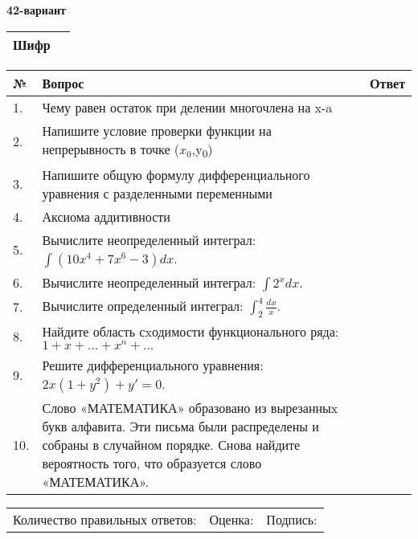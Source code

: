 \documentclass{article}
\begin{document}
  \egroup
  
  \newpage
  
  
  \textbf{42-вариант}\\
  
  \bgroup
  \def\arraystretch{1.6} %
  
  \begin{tabular}{|m{5.7cm}|m{9.5cm}|}
  \hline
  Шифр & \\
  \hline
  \end{tabular}
  
  \vspace{1cm}
  
  \begin{tabular}{|m{0.7cm}|m{10cm}|m{4cm}|}
  \hline
  № & Вопрос & Ответ \\
  \hline
  1. & Чему равен остаток при делении многочлена на x-a &  \\
  \hline
  2. & Напишите условие проверки функции на непрерывность в точке (\(x_{0}\),y\textsubscript{0}) &  \\
  \hline
  3. & Напишите общую формулу дифференциального уравнения с разделенными переменными &  \\
  \hline
  4. & Аксиома аддитивности &  \\
  \hline
  5. & Вычислите неопределенный интеграл: \(\int{\left( 10x^{4} + 7x^{6} - 3 \right)dx}\). &  \\
  \hline
  6. & Вычислите неопределенный интеграл: \(\int2^{x}dx\). &  \\
  \hline
  7. & Вычислите определенный интеграл: \(\int_{2}^{4}\frac{dx}{x}\). &  \\
  \hline
  8. & Найдите область сxодимости функционального ряда:\(1 + x + ... + x^{n} + ...\) &  \\
  \hline
  9. & Решите дифференциального уравнения: \(2x\left( 1 + y^{2} \right) + y' = 0\). &  \\
  \hline
  10. & Слово «МАТЕМАТИКА» образовано из вырезанныx букв алфавита. Эти письма были распределены и собраны в случайном порядке. Снова найдите вероятность того, что образуется слово «МАТЕМАТИКА». &  \\
  \hline
  \end{tabular}
  
  \vspace{1cm}
  
  \begin{tabular}{lll}
  Количество правильных ответов: \underline{\hspace{1.5cm}} & 
  Оценка: \underline{\hspace{1.5cm}} & 
  Подпись: \underline{\hspace{2cm}} \\
  \end{tabular}
  
\end{document}
